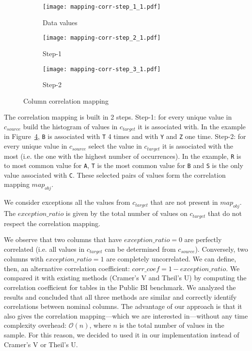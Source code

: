 \begin{figure}[h]
  \centering
  \begin{subfigure}[t]{0.22\linewidth}
    \centering
    \texttt{[image: mapping-corr-step\_1\_1.pdf]}
    \caption[b]{Data values}
    \label{fig:pd:columncorrelation:mapping:step1}
  \end{subfigure}
  \hspace{3em}
  \begin{subfigure}[t]{0.23\linewidth}
    \centering
    \texttt{[image: mapping-corr-step\_2\_1.pdf]}
    \caption[b]{Step-1}
    \label{fig:pd:columncorrelation:mapping:step2}
  \end{subfigure}
  \hspace{3em}
  \begin{subfigure}[t]{0.23\linewidth}
    \centering
    \texttt{[image: mapping-corr-step\_3\_1.pdf]}
    \caption[b]{Step-2}
    \label{fig:pd:columncorrelation:mapping:step3}
  \end{subfigure}
  \caption{Column correlation mapping}
  \label{fig:pd:columncorrelation:mapping}
\end{figure}

The correlation mapping is built in 2 steps. Step-1: for every unique value in \(c_{source}\) build the histogram of values in \(c_{target}\) it is associated with. In the example in Figure~\ref{fig:pd:columncorrelation:mapping}, \verb|B| is associated with \verb|T| 4 times and with \verb|Y| and \verb|Z| one time. Step-2: for every unique value in \(c_{source}\) select the value in \(c_{target}\) it is associated with the most (i.e. the one with the highest number of occurrences). In the example, \verb|R| is to most common value for \verb|A|, \verb|T| is the most common value for \verb|B| and \verb|S| is the only value associated with \verb|C|. These selected pairs of values form the correlation mapping \(map_{obj}\).

We consider exceptions all the values from \(c_{target}\) that are not present in \(map_{obj}\). The \(exception\_ratio\) is given by the total number of values on \(c_{target}\) that do not respect the correlation mapping.

We observe that two columns that have \(exception\_ratio = 0\) are perfectly correlated (i.e. all values in \(c_{target}\) can be determined from \(c_{source}\)). Conversely, two columns with \(exception\_ratio = 1\) are completely uncorrelated. We can define, then, an alternative correlation coefficient: 
\(\mathit{corr\_coef} = 1 - exception\_ratio\). We compared it with existing methods (Cramer's V and Theil's U) by computing the correlation coefficient for tables in the Public BI benchmark. We analyzed the results and concluded that all three methods are similar and correctly identify correlations between nominal columns. The advantage of our approach is that it also gives the correlation mapping---which we are interested in---without any time complexity overhead: \(\mathcal{O}(n)\), where \(n\) is the total number of values in the sample. For this reason, we decided to used it in our implementation instead of Cramer's V or Theil's U.

